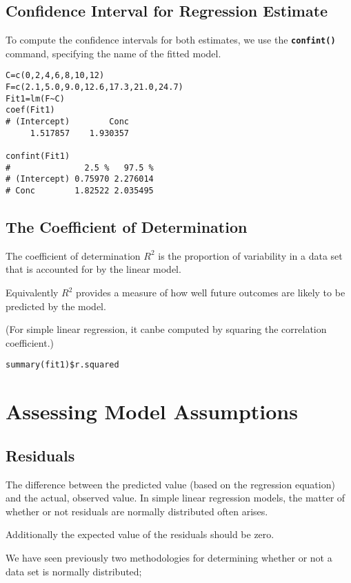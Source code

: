 \documentclass[ModuleBmain.tex]{subfiles}
\begin{document}
\subsection{Confidence Interval for Regression Estimate}
To compute the confidence intervals for both estimates, we use the \texttt\textbf{{confint()}} command, specifying the name of the fitted model.
\begin{framed}
\begin{verbatim}
C=c(0,2,4,6,8,10,12)
F=c(2.1,5.0,9.0,12.6,17.3,21.0,24.7)
Fit1=lm(F~C)
coef(Fit1)
# (Intercept)        Conc
     1.517857    1.930357

confint(Fit1)
#               2.5 %   97.5 %
# (Intercept) 0.75970 2.276014
# Conc        1.82522 2.035495
\end{verbatim}
\end{framed}

\subsection{The Coefficient of Determination}
The coefficient of determination $R^2$ is the proportion of variability in a data set that is accounted for by the linear model.

Equivalently $R^2$ provides a measure of how well future outcomes are likely to be predicted by the model.

(For simple linear regression, it canbe computed by squaring the correlation coefficient.)

\begin{framed}
\begin{verbatim}
summary(fit1)$r.squared
\end{verbatim}
\end{framed}
\newpage
\section{Assessing Model Assumptions}
\subsection{Residuals}  The difference between the predicted value (based on the regression equation) and the actual, observed value. In simple linear regression models, the matter of whether or not residuals are normally distributed often arises.

Additionally the expected value of the residuals should be zero.

We have seen previously two methodologies for determining whether or not a data set is normally distributed;
\end{document}
